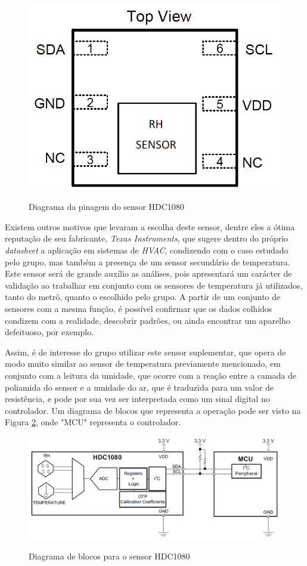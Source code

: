 \documentclass[acronym,symbols,table]{fei}
\begin{document}
\begin{figure}[!htb]
\centering
    \caption{Diagrama da pinagem do sensor HDC1080}
    \includegraphics[width=0.4\linewidth]{Imagens/PinHum.png}
    \label{fig:PinHum}
\end{figure}

Existem outros motivos que levaram a escolha deste sensor, dentre eles a ótima reputação de seu fabricante, \textit{Texas Instruments}, que sugere dentro do próprio \textit{datasheet} a aplicação em sistemas de \textit{HVAC}, condizendo com o caso estudado pelo grupo, mas também a presença de um sensor secundário de temperatura. Este sensor será de grande auxílio as análises, pois apresentará um carácter de validação ao trabalhar em conjunto com os sensores de temperatura já utilizados, tanto do metrô, quanto o escolhido pelo grupo. A partir de um conjunto de sensores com a mesma função, é possível confirmar que os dados colhidos condizem com a realidade, descobrir padrões, ou ainda encontrar um aparelho defeituoso, por exemplo. 

Assim, é de interesse do grupo utilizar este sensor suplementar, que opera de modo muito similar ao sensor de temperatura previamente mencionado, em conjunto com a leitura da umidade, que ocorre com a reação entre a camada de poliamida do sensor e a umidade do ar, que é traduzida para um valor de resistência, e pode por sua vez ser interpretada como um sinal digital no controlador. Um diagrama de blocos que representa a operação pode ser visto na Figura \ref{fig:DiagBlocHum}, onde "MCU" representa o controlador.

\begin{figure}[!htb]
\centering
    \caption{Diagrama de blocos para o sensor HDC1080}
    \includegraphics[width=0.75\linewidth]{Imagens/DiagBlocHum.png}
    \label{fig:DiagBlocHum}
\end{figure}
\end{document}
